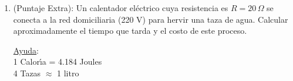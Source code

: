\documentclass[a4paper,12pt]{article}
\begin{document}
\begin{enumerate}
\vspace{1cm}
\item (Puntaje Extra): 
Un calentador el\'ectrico cuya resistencia es $R= 20 \, \Omega$ 
se conecta a la red domiciliaria (220 V) para hervir una taza de 
agua. Calcular aproximadamente el tiempo que tarda y el 
costo de este proceso. 

\vspace{0.25 cm}
\underline{Ayuda}:\\
1 Calor\'{\i}a = 4.184 Joules \\
4 Tazas $\approx$ 1 litro

\end{enumerate}
\end{document}

